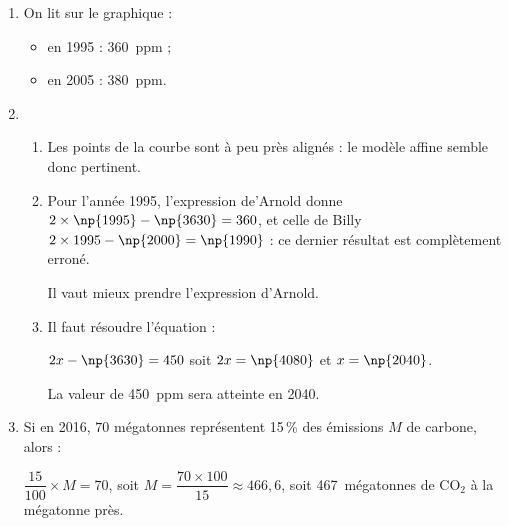 \begin{enumerate}
\item %
On lit sur le graphique :
\begin{itemize}
\item en 1995 : 360~ppm ;
\item en 2005 : 380~ppm. 
\end{itemize}

\item %
	\begin{enumerate}
		\item %
Les points de la courbe sont à peu près alignés : le modèle affine semble donc pertinent.
		\item  %
		
		
		
Pour l'année 1995, l'expression de'Arnold donne $2 \times \np{1995} - \np{3630} = 360$, et celle de Billy $2 \times 1995 - \np{2000} = \np{1990}$ : ce dernier résultat est complètement erroné.

Il vaut mieux prendre l'expression d'Arnold.
		\item  %
		Il faut résoudre l'équation :
		
$2x - \np{3630} = 450$ soit $2x = \np{4080}$ et $x = \np{2040}$.

La valeur de 450~ppm sera atteinte en 2040.
 	\end{enumerate}
\item  %
	
Si en 2016, $70$ mégatonnes représentent 15\,\% des émissions $M$ de carbone, alors :

$\dfrac{15}{100} \times M = 70$, soit $M = \dfrac{70 \times 100}{15} \approx 466,6$, soit 467~mégatonnes de CO$_2$ à la mégatonne près.
\end{enumerate}

\bigskip

